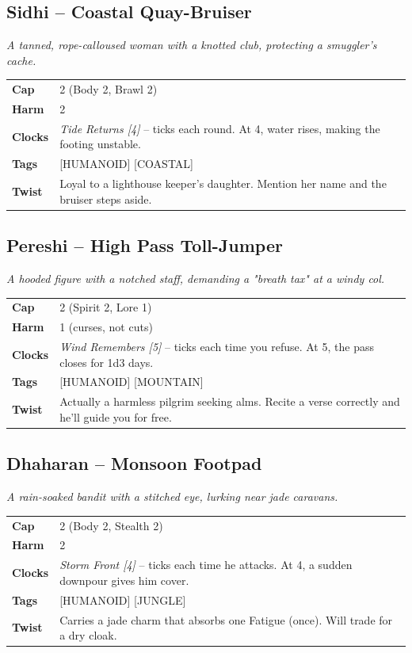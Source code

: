 \documentclass[10pt,twocolumn]{article}
\newcommand{\kw}[1]{\textbf{#1}}     %
\begin{document}
\subsection*{Sidhi -- Coastal Quay-Bruiser}
\textit{A tanned, rope-calloused woman with a knotted club, protecting a smuggler's cache.}
\begin{tabular}{@{}ll}
\toprule
\kw{Cap} & 2 (Body 2, Brawl 2) \\
\kw{Harm} & 2 \\
\kw{Clocks} & \textit{Tide Returns [4]} -- ticks each round. At 4, water rises, making the footing unstable. \\
\kw{Tags} & [HUMANOID] [COASTAL] \\
\kw{Twist} & Loyal to a lighthouse keeper's daughter. Mention her name and the bruiser steps aside. \\
\bottomrule
\end{tabular}

\subsection*{Pereshi -- High Pass Toll-Jumper}
\textit{A hooded figure with a notched staff, demanding a "breath tax" at a windy col.}
\begin{tabular}{@{}ll}
\toprule
\kw{Cap} & 2 (Spirit 2, Lore 1) \\
\kw{Harm} & 1 (curses, not cuts) \\
\kw{Clocks} & \textit{Wind Remembers [5]} -- ticks each time you refuse. At 5, the pass closes for 1d3 days. \\
\kw{Tags} & [HUMANOID] [MOUNTAIN] \\
\kw{Twist} & Actually a harmless pilgrim seeking alms. Recite a verse correctly and he'll guide you for free. \\
\bottomrule
\end{tabular}

\subsection*{Dhaharan -- Monsoon Footpad}
\textit{A rain-soaked bandit with a stitched eye, lurking near jade caravans.}
\begin{tabular}{@{}ll}
\toprule
\kw{Cap} & 2 (Body 2, Stealth 2) \\
\kw{Harm} & 2 \\
\kw{Clocks} & \textit{Storm Front [4]} -- ticks each time he attacks. At 4, a sudden downpour gives him cover. \\
\kw{Tags} & [HUMANOID] [JUNGLE] \\
\kw{Twist} & Carries a jade charm that absorbs one Fatigue (once). Will trade for a dry cloak. \\
\bottomrule
\end{tabular}
\end{document}
